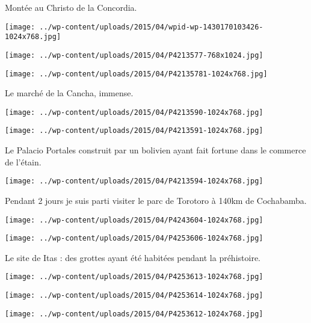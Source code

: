 \pagebreak
 Montée au Christo de la Concordia. 
\begin{center} \texttt{[image: ../wp-content/uploads/2015/04/wpid-wp-1430170103426-1024x768.jpg]} \end{center}
\begin{center} \texttt{[image: ../wp-content/uploads/2015/04/P4213577-768x1024.jpg]} \end{center}
\begin{center} \texttt{[image: ../wp-content/uploads/2015/04/P42135781-1024x768.jpg]} \end{center}

 Le marché de la Cancha, immense. 
\begin{center} \texttt{[image: ../wp-content/uploads/2015/04/P4213590-1024x768.jpg]} \end{center}
\begin{center} \texttt{[image: ../wp-content/uploads/2015/04/P4213591-1024x768.jpg]} \end{center}

 Le Palacio Portales construit par un bolivien ayant fait fortune dans le commerce de l'étain. 
\begin{center} \texttt{[image: ../wp-content/uploads/2015/04/P4213594-1024x768.jpg]} \end{center}

\pagebreak
 Pendant 2 jours je suis parti visiter le parc de Torotoro à 140km de Cochabamba. 
\begin{center} \texttt{[image: ../wp-content/uploads/2015/04/P4243604-1024x768.jpg]} \end{center}
\begin{center} \texttt{[image: ../wp-content/uploads/2015/04/P4253606-1024x768.jpg]} \end{center}

\pagebreak
 Le site de Itas : des grottes ayant été habitées pendant la préhistoire. 
\begin{center} \texttt{[image: ../wp-content/uploads/2015/04/P4253613-1024x768.jpg]} \end{center}
\begin{center} \texttt{[image: ../wp-content/uploads/2015/04/P4253614-1024x768.jpg]} \end{center}
\begin{center} \texttt{[image: ../wp-content/uploads/2015/04/P4253612-1024x768.jpg]} \end{center}

